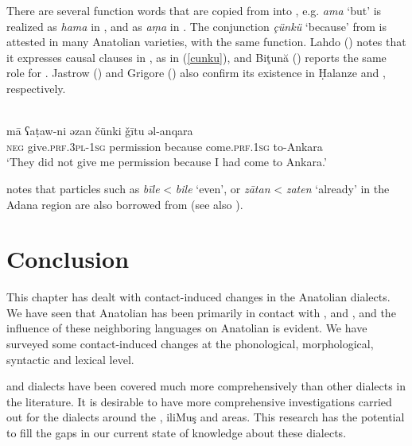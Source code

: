 \documentclass[output=paper]{langsci/langscibook}
\begin{document}
There are several function words that are copied from  into , e.g.  \textit{ama} `but' is realized as \textit{hama} in , and as \textit{a\d{m}a} in  . The conjunction \textit{\c{c}\"{u}nk\"{u}} `because' from  is attested in many Anatolian varieties, with the same function. Lahdo (\citeyear[179]{Lahdo2009}) notes that it expresses causal clauses in , as in (\ref{cunku}), and Biţună  (\citeyear[213]{Bituna2016}) reports the same role for . Jastrow (\citeyear[278]{Jastrow1981}) and Grigore (\citeyear[261]{Grigore2007book}) also confirm its existence in Ḥalanze and , respectively.

\begin{exe}
\ex {}  \citep[179]{Lahdo2009}\\
\label{cunku} \gll m\={a} ʕa\d{t}aw-ni əzan \v{c}\"{u}nki \v{g}\={i}tu əl-anqara\\
\textsc{neg} give.\textsc{prf.3pl}-\textsc{1sg} permission because come.\textsc{prf.1sg} to-Ankara\\
\glt `They did not give me permission because I had come to Ankara.'
\end{exe}


\noindent \cite{Procházka2005} notes that particles such as \textit{b\={i}le} < \textit{bile} `even', or \textit{z\={a}tan} < \textit{zaten} `already' in the Adana region are also borrowed from  (see also \citealt{Isaksson2005}).

\section{Conclusion}

This chapter has dealt with contact-induced changes in the Anatolian  dialects. We have seen that Anatolian  has been primarily in contact with ,  and , and the influence of these neighboring languages on Anatolian  is evident. We have surveyed some contact-induced changes at the phonological, morphological, syntactic and lexical level. %


 and  dialects have been covered much more comprehensively than other dialects in the literature. It is desirable to have more comprehensive investigations carried out for the dialects around the , ili{Muş} and  areas. This research has the potential to fill the gaps in our current state of knowledge about these dialects.
\end{document}
